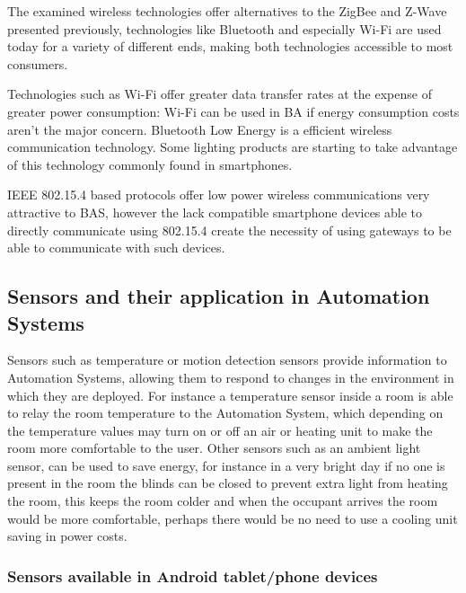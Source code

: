 The examined wireless technologies offer alternatives to the ZigBee and Z-Wave presented previously, technologies like Bluetooth and especially Wi-Fi are used today for a variety of different ends, making both technologies accessible to most consumers.

Technologies such as Wi-Fi offer greater data transfer rates at the expense of greater power consumption: Wi-Fi can be used in BA if energy consumption costs aren't the major concern. Bluetooth Low Energy is a efficient wireless communication technology. Some lighting products are starting to take advantage of this technology commonly found in smartphones.

IEEE 802.15.4 based protocols offer low power wireless communications very attractive to BAS, however the lack compatible smartphone devices able to directly communicate using 802.15.4 create the necessity of using gateways to be able to communicate with such devices.  




\subsection{Sensors and their application in Automation Systems} \label{ssec:num4}\mbox{}

Sensors such as temperature or motion detection sensors provide information to Automation Systems, allowing them to respond to changes in the environment in which they are deployed. For instance a temperature sensor inside a room is able to relay the room temperature to the Automation System, which depending on the temperature values may turn on or off an air or heating unit to make the room more comfortable to the user.
Other sensors such as an ambient light sensor, can be used to save energy, for instance in a very bright day if no one is present in the room the blinds can be closed to prevent extra light from heating the room, this keeps the room colder and when the occupant arrives the room would be more comfortable, perhaps there would be no need to use a cooling unit saving in power costs.



\subsubsection{Sensors available in Android tablet/phone devices}\mbox{}\\

